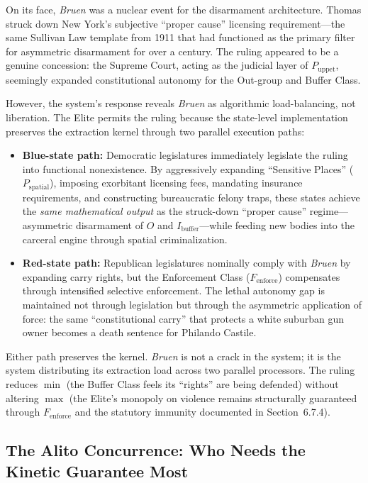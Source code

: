 \documentclass[12pt,openany]{book}
\begin{document}
On its face, \textit{Bruen} was a nuclear event for the disarmament architecture. Thomas struck down New York's subjective ``proper cause'' licensing requirement---the same Sullivan Law template from 1911 that had functioned as the primary filter for asymmetric disarmament for over a century. The ruling appeared to be a genuine concession: the Supreme Court, acting as the judicial layer of $P_{\text{uppet}}$, seemingly expanded constitutional autonomy for the Out-group and Buffer Class.

However, the system's response reveals \textit{Bruen} as algorithmic load-balancing, not liberation. The Elite permits the ruling because the state-level implementation preserves the extraction kernel through two parallel execution paths:

\begin{itemize}
    \item \textbf{Blue-state path:} Democratic legislatures immediately legislate the ruling into functional nonexistence. By aggressively expanding ``Sensitive Places'' ($P_{\text{spatial}}$), imposing exorbitant licensing fees, mandating insurance requirements, and constructing bureaucratic felony traps, these states achieve the \textit{same mathematical output} as the struck-down ``proper cause'' regime---asymmetric disarmament of $O$ and $I_{\text{buffer}}$---while feeding new bodies into the carceral engine through spatial criminalization.

    \item \textbf{Red-state path:} Republican legislatures nominally comply with \textit{Bruen} by expanding carry rights, but the Enforcement Class ($F_{\text{enforce}}$) compensates through intensified selective enforcement. The lethal autonomy gap is maintained not through legislation but through the asymmetric application of force: the same ``constitutional carry'' that protects a white suburban gun owner becomes a death sentence for Philando Castile.
\end{itemize}

Either path preserves the kernel. \textit{Bruen} is not a crack in the system; it is the system distributing its extraction load across two parallel processors. The ruling reduces $\min$ (the Buffer Class feels its ``rights'' are being defended) without altering $\max$ (the Elite's monopoly on violence remains structurally guaranteed through $F_{\text{enforce}}$ and the statutory immunity documented in Section~6.7.4).

\subsection{The Alito Concurrence: Who Needs the Kinetic Guarantee Most}
\end{document}
